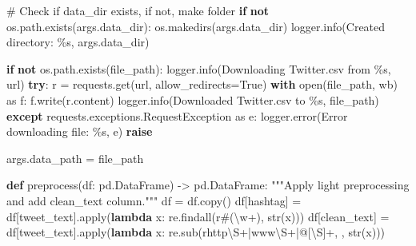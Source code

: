 \documentclass[
  letterpaper,
  DIV=11,
  numbers=noendperiod]{scrartcl}
\newenvironment{Shaded}{\begin{snugshade}}{\end{snugshade}}
\newcommand{\BuiltInTok}[1]{\textcolor[rgb]{0.00,0.23,0.31}{#1}}
\newcommand{\CommentTok}[1]{\textcolor[rgb]{0.37,0.37,0.37}{#1}}
\newcommand{\ControlFlowTok}[1]{\textcolor[rgb]{0.00,0.23,0.31}{\textbf{#1}}}
\newcommand{\ImportTok}[1]{\textcolor[rgb]{0.00,0.46,0.62}{#1}}
\newcommand{\KeywordTok}[1]{\textcolor[rgb]{0.00,0.23,0.31}{\textbf{#1}}}
\newcommand{\NormalTok}[1]{\textcolor[rgb]{0.00,0.23,0.31}{#1}}
\newcommand{\OperatorTok}[1]{\textcolor[rgb]{0.37,0.37,0.37}{#1}}
\newcommand{\SpecialCharTok}[1]{\textcolor[rgb]{0.37,0.37,0.37}{#1}}
\newcommand{\StringTok}[1]{\textcolor[rgb]{0.13,0.47,0.30}{#1}}
\newcommand{\VariableTok}[1]{\textcolor[rgb]{0.07,0.07,0.07}{#1}}
\newcommand{\VerbatimStringTok}[1]{\textcolor[rgb]{0.13,0.47,0.30}{#1}}
\begin{document}
\begin{Shaded}
\begin{Highlighting}[]
    \CommentTok{\# Check if data\_dir exists, if not, make folder}
    \ControlFlowTok{if} \KeywordTok{not}\NormalTok{ os.path.exists(args.data\_dir):}
\NormalTok{        os.makedirs(args.data\_dir)}
\NormalTok{        logger.info(}\StringTok{\textquotesingle{}Created directory: }\SpecialCharTok{\%s}\StringTok{\textquotesingle{}}\NormalTok{, args.data\_dir)}

    \ControlFlowTok{if} \KeywordTok{not}\NormalTok{ os.path.exists(file\_path):}
\NormalTok{        logger.info(}\StringTok{\textquotesingle{}Downloading Twitter.csv from }\SpecialCharTok{\%s}\StringTok{\textquotesingle{}}\NormalTok{, url)}
        \ControlFlowTok{try}\NormalTok{:}
\NormalTok{            r }\OperatorTok{=}\NormalTok{ requests.get(url, allow\_redirects}\OperatorTok{=}\VariableTok{True}\NormalTok{)}
            \ControlFlowTok{with} \BuiltInTok{open}\NormalTok{(file\_path, }\StringTok{\textquotesingle{}wb\textquotesingle{}}\NormalTok{) }\ImportTok{as}\NormalTok{ f:}
\NormalTok{                f.write(r.content)}
\NormalTok{            logger.info(}\StringTok{\textquotesingle{}Downloaded Twitter.csv to }\SpecialCharTok{\%s}\StringTok{\textquotesingle{}}\NormalTok{, file\_path)}
        \ControlFlowTok{except}\NormalTok{ requests.exceptions.RequestException }\ImportTok{as}\NormalTok{ e:}
\NormalTok{            logger.error(}\StringTok{\textquotesingle{}Error downloading file: }\SpecialCharTok{\%s}\StringTok{\textquotesingle{}}\NormalTok{, e)}
            \ControlFlowTok{raise}

\NormalTok{    args.data\_path }\OperatorTok{=}\NormalTok{ file\_path}

\KeywordTok{def}\NormalTok{ preprocess(df: pd.DataFrame) }\OperatorTok{{-}\textgreater{}}\NormalTok{ pd.DataFrame:}
    \CommentTok{"""Apply light preprocessing and add \textasciigrave{}clean\_text\textasciigrave{} column."""}
\NormalTok{    df }\OperatorTok{=}\NormalTok{ df.copy()}
\NormalTok{    df[}\StringTok{\textquotesingle{}hashtag\textquotesingle{}}\NormalTok{] }\OperatorTok{=}\NormalTok{ df[}\StringTok{\textquotesingle{}tweet\_text\textquotesingle{}}\NormalTok{].}\BuiltInTok{apply}\NormalTok{(}\KeywordTok{lambda}\NormalTok{ x: re.findall(}\VerbatimStringTok{r\textquotesingle{}\#(\textbackslash{}w+)\textquotesingle{}}\NormalTok{, }\BuiltInTok{str}\NormalTok{(x)))}
\NormalTok{    df[}\StringTok{\textquotesingle{}clean\_text\textquotesingle{}}\NormalTok{] }\OperatorTok{=}\NormalTok{ df[}\StringTok{\textquotesingle{}tweet\_text\textquotesingle{}}\NormalTok{].}\BuiltInTok{apply}\NormalTok{(}\KeywordTok{lambda}\NormalTok{ x: re.sub(}\VerbatimStringTok{r\textquotesingle{}http\textbackslash{}S+|www\textbackslash{}S+|@[\textbackslash{}S]+\textquotesingle{}}\NormalTok{, }\StringTok{\textquotesingle{}\textquotesingle{}}\NormalTok{, }\BuiltInTok{str}\NormalTok{(x)))}


\end{Highlighting}
\end{Shaded}
\end{document}
